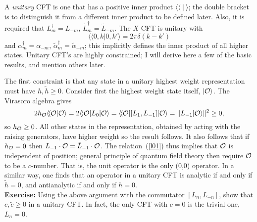 A {\it unitary} CFT is one that has a positive inner product
$\langle
\!\langle \ |\ \rangle$; the double bracket is to distinguish it
from a different inner product to be defined later.  Also, it is
required that $L_m^\dagger = L_{-m}$, $\tilde L_m^\dagger =
\tilde L_{-m}$.   The
$X$ CFT is unitary with 
\begin{equation}
\langle\!\langle 0,k|0,k'\rangle = 2\pi \delta(k - k')
\end{equation}
and $\alpha_m^\dagger = \alpha_{-m}$, $\tilde \alpha_m^\dagger =
\tilde \alpha_{-m}$; this implicitly defines the inner product of
all higher states.  Unitary CFT's are highly constrained; I will
derive here a few of the basic results, and mention others later.

The first constraint is that any state in a unitary highest weight
representation must have $h, \tilde h \geq 0$.  Consider first the
highest weight state itself, $|{\cal O}\rangle$.
The Virasoro algebra gives
\begin{equation}
2 h_{\cal O} \langle\!\langle {\cal O}|{\cal O}\rangle
= 2 \langle\!\langle {\cal O}|L_0|{\cal O}\rangle
= \langle\!\langle {\cal O}| [ L_1, L_{-1} ]|{\cal O}\rangle 
= \| L_{-1} |{\cal O}\rangle \|^2 \geq 0,
\end{equation}
so $h_{\cal O} \geq 0$.  All other states in the representation,
obtained by acting with the raising generators,
have higher weight so the result follows.
It also follows that if $h_{\cal O} = 0$ then
$L_{-1} \cdot {\cal O} = \tilde L_{-1} \cdot {\cal O}$.  The
relation~(\ref{l01}) thus implies that $\cal O$ is independent of
position; general principle of quantum field theory then
require $\cal O$ to be a $c$-number.  That is, the 
 unit operator is the only
(0,0) operator.  In a similar way, one finds that an operator in
a unitary CFT is analytic if and only if $\tilde h = 0$,
and antianalytic if and only if $h = 0$.\\[3pt]
{\bf Exercise:} Using the above argument with the commutator
$[ L_n, L_{-n} ]$, show that $c, \tilde c \geq 0$ in a unitary
CFT.  In fact, the only CFT with
$c = 0$ is the trivial one, $L_n = 0$.


